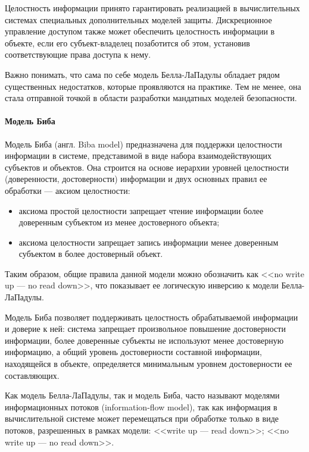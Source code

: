 Целостность информации принято гарантировать реализацией в вычислительных системах специальных дополнительных моделей защиты. Дискреционное управление доступом также может обеспечить целостность информации в объекте, если его субъект-владелец позаботится об этом, установив соответствующие права доступа к нему.

Важно понимать, что сама по себе модель Белла-ЛаПадулы обладает рядом существенных недостатков, которые проявляются на практике. Тем не менее, она стала отправной точкой в области разработки мандатных моделей безопасности.

\paragraph{Модель Биба}

Модель Биба (англ. Biba model) предназначена для поддержки целостности информации в системе, представимой в виде набора взаимодействующих субъектов и объектов. Она строится на основе иерархии уровней целостности (доверенности, достоверности) информации и двух основных правил ее обработки --- аксиом целостности:

\begin{itemize}
	\item аксиома простой целостности запрещает чтение информации более доверенным субъектом из менее достоверного объекта;
	\item аксиома целостности запрещает запись информации менее доверенным субъектом в более достоверный объект.
\end{itemize}

Таким образом, общие правила данной модели можно обозначить как <<no write up --- no read down>>, что показывает ее логическую инверсию к модели Белла-ЛаПадулы.

Модель Биба позволяет поддерживать целостность обрабатываемой информации и доверие к ней: система запрещает произвольное повышение достоверности информации, более доверенные субъекты не используют менее достоверную информацию, а общий уровень достоверности составной информации, находящейся в объекте, определяется минимальным уровнем достоверности ее составляющих.

Как модель Белла-ЛаПадулы, так и модель Биба, часто называют моделями информационных потоков (information-flow model), так как информация в вычислительной системе может перемещаться при обработке только в виде потоков, разрешенных в рамках модели: <<write up --- read down>>; <<no write up --- no read down>>.


